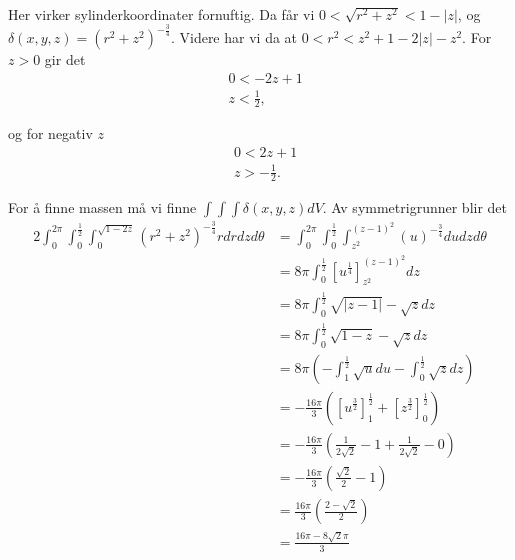 \documentclass[11pt, a4paper, norsk]{NTNUoving}
\begin{document}
\ifx
\begin{oppgave}
    \begin{punkt}
        \begin{align*}
        
        
        \end{align*}
    \end{punkt}
\end{oppgave}
\fi

\begin{oppgave}
    Her virker sylinderkoordinater fornuftig. Da får vi $0 < \sqrt{r^2+z^2} < 1-|z|$, og $\delta(x, y, z) =(r^2+z^2)^{-\frac{3}{4}}$. Videre har vi da at $0 < r^2 < z^2+1-2|z|-z^2$. For $z>0$ gir det
    \begin{align*}
        &0< -2z+1\\
        &z<\frac{1}{2},
    \end{align*}
    
    og for negativ $z$
    \begin{align*}
        &0< 2z+1\\
        &z > -\frac{1}{2}.
    \end{align*}
    
    For å finne massen må vi finne $\int\int\int\delta(x, y, z)dV$. Av symmetrigrunner blir det
    \begin{align*}
        2\int_0^{2\pi}\int_0^{\frac{1}{2}}\int_0^{\sqrt{1-2z}}(r^2+z^2)^{-\frac{3}{4}}rdrdzd\theta&=\int_0^{2\pi}\int_0^{\frac{1}{2}}\int_{z^2}^{(z-1)^2}(u)^{-\frac{3}{4}}dudzd\theta
        \\&=8\pi\int_0^{\frac{1}{2}}[u^{\frac{1}{4}}]_{z^2}^{(z-1)^2}dz
        \\&=8\pi\int_0^\frac{1}{2}\sqrt{|z-1|}-\sqrt{z}dz
        \\&=8\pi \int_{0}^{\frac{1}{2}}\sqrt{1-z}-\sqrt{z}dz
        \\&=8\pi \left(-\int_{1}^{\frac{1}{2}}\sqrt{u}du-\int_0^{\frac{1}{2}}\sqrt{z}dz\right)
        \\&=-\frac{16\pi}{3}\left( [u^\frac{3}{2}]_{1}^{\frac{1}{2}}+[z^\frac{3}{2}]_{0}^{\frac{1}{2}}\right)
        \\&=-\frac{16\pi}{3}\left(\frac{1}{2\sqrt{2}}-1+\frac{1}{2\sqrt{2}}-0\right)
        \\&=-\frac{16\pi}{3}\left(\frac{\sqrt{2}}{2}-1\right)
        \\&=\frac{16\pi}{3}\left(\frac{2-\sqrt{2}}{2}\right)
        \\&=\frac{16\pi-8\sqrt{2}\pi}{3}
    \end{align*}
\end{oppgave}
\end{document}

